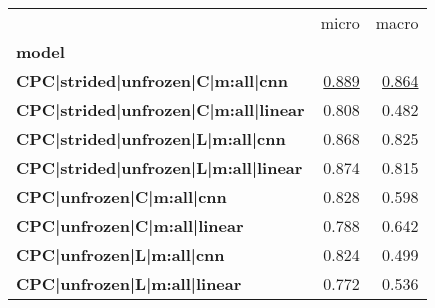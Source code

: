 \begin{adjustbox}{width=\textwidth}
\begin{tabular}{lrr}
\toprule
{} &  micro &  macro \\
\textbf{model                                            } &        &        \\
\midrule
\textbf{CPC|strided|unfrozen|C|m:all|cnn   } &  \underline{0.889} &  \underline{0.864} \\
\textbf{CPC|strided|unfrozen|C|m:all|linear} &  0.808 &  0.482 \\
\textbf{CPC|strided|unfrozen|L|m:all|cnn   } &  0.868 &  0.825 \\
\textbf{CPC|strided|unfrozen|L|m:all|linear} &  0.874 &  0.815 \\
\textbf{CPC|unfrozen|C|m:all|cnn           } &  0.828 &  0.598 \\
\textbf{CPC|unfrozen|C|m:all|linear        } &  0.788 &  0.642 \\
\textbf{CPC|unfrozen|L|m:all|cnn           } &  0.824 &  0.499 \\
\textbf{CPC|unfrozen|L|m:all|linear        } &  0.772 &  0.536 \\
\bottomrule
\end{tabular}
\end{adjustbox}